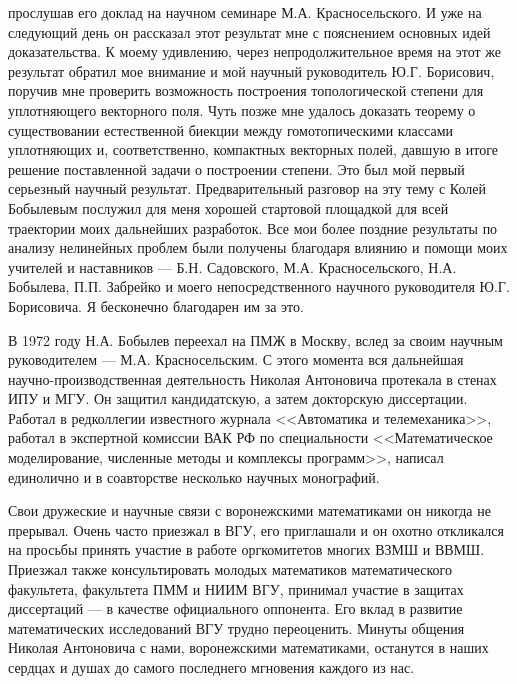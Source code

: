 прослушав его доклад на научном семинаре М.А. Красносельского. И уже
на следующий день он рассказал этот результат мне с пояснением
основных идей доказательства. К моему удивлению, через
непродолжительное время на этот же результат обратил мое внимание и
мой научный руководитель Ю.Г. Борисович, поручив мне проверить
возможность построения топологической степени для уплотняющего
векторного поля. Чуть позже мне удалось доказать теорему о
существовании естественной биекции между гомотопическими классами
уплотняющих и, соответственно, компактных векторных полей, давшую в
итоге решение поставленной задачи о построении степени. Это был мой
первый серьезный научный результат. Предварительный разговор на эту
тему с Колей Бобылевым послужил для меня хорошей стартовой площадкой
для всей траектории моих дальнейших разработок. Все мои более
поздние результаты по анализу нелинейных проблем были получены
благодаря влиянию и помощи моих учителей и наставников --- Б.Н.
Садовского, М.А. Красносельского, Н.А. Бобылева, П.П. Забрейко и
моего непосредственного научного руководителя Ю.Г. Борисовича. Я
бесконечно благодарен им за это.

В 1972 году Н.А. Бобылев переехал на ПМЖ в Москву, вслед за своим
научным руководителем --- М.А. Красносельским. С этого момента вся
дальнейшая на\-уч\-но-про\-из\-вод\-ствен\-ная деятельность Николая
Антоновича протекала в стенах ИПУ и МГУ. Он защитил кандидатскую, а
затем докторскую диссертации. Работал в редколлегии известного
журнала <<Автоматика и телемеханика>>, работал в экспертной комиссии
ВАК РФ по специальности <<Математическое моделирование, численные
методы и комплексы программ>>, написал единолично и в соавторстве
несколько научных монографий.

Свои дружеские и научные связи с воронежскими математиками он
никогда не прерывал. Очень часто приезжал в ВГУ, его приглашали и он
охотно откликался на просьбы принять участие в работе оргкомитетов
многих ВЗМШ и ВВМШ. Приезжал также консультировать молодых
математиков математического факультета, факультета ПММ и НИИМ ВГУ,
принимал участие в защитах диссертаций --- в качестве официального
оппонента. Его вклад в развитие математических исследований ВГУ
трудно переоценить. Минуты общения Николая Антоновича с нами,
воронежскими математиками, останутся в наших сердцах и душах до
самого последнего мгновения каждого из нас.
